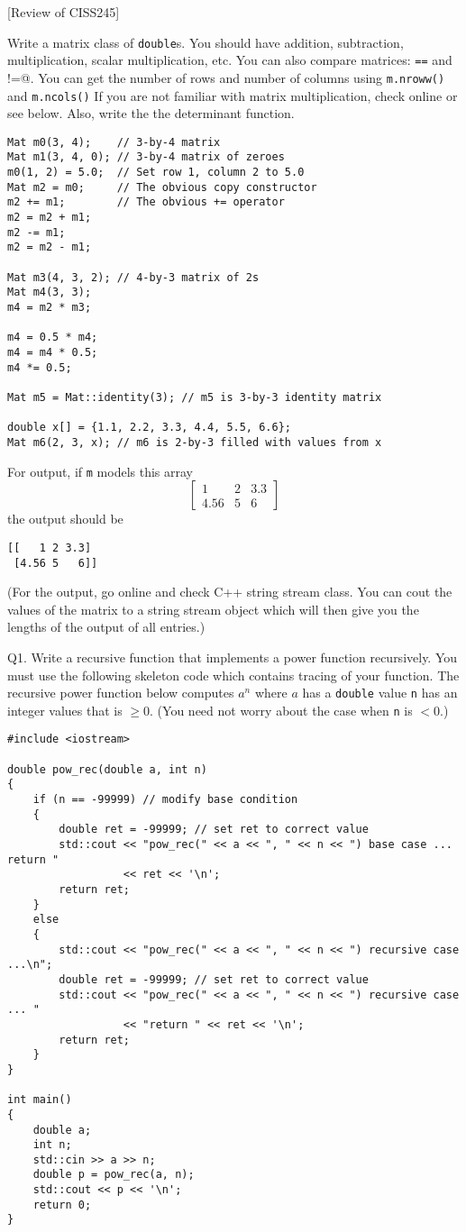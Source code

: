 [Review of CISS245]

Write a matrix class of \texttt{double}s.
You should have addition, subtraction, multiplication,
scalar multiplication, etc.
You can also compare matrices: \verb!==! and \verb@!=@.
You can get the number of rows and number of columns using
\verb!m.nroww()!
and
\verb!m.ncols()!
If you are not familiar with matrix multiplication,
check online or see below.
Also, write the the determinant function.
\begin{Verbatim}[frame=single]
Mat m0(3, 4);    // 3-by-4 matrix
Mat m1(3, 4, 0); // 3-by-4 matrix of zeroes
m0(1, 2) = 5.0;  // Set row 1, column 2 to 5.0
Mat m2 = m0;     // The obvious copy constructor
m2 += m1;        // The obvious += operator
m2 = m2 + m1;
m2 -= m1;
m2 = m2 - m1;

Mat m3(4, 3, 2); // 4-by-3 matrix of 2s
Mat m4(3, 3);
m4 = m2 * m3;

m4 = 0.5 * m4;
m4 = m4 * 0.5;
m4 *= 0.5;

Mat m5 = Mat::identity(3); // m5 is 3-by-3 identity matrix

double x[] = {1.1, 2.2, 3.3, 4.4, 5.5, 6.6};
Mat m6(2, 3, x); // m6 is 2-by-3 filled with values from x
\end{Verbatim}
For output, if \verb!m! models this array
\[
\begin{bmatrix}
1 & 2 & 3.3 \\
4.56 & 5 & 6 
\end{bmatrix}
\]
the output should be
\begin{Verbatim}
[[   1 2 3.3]
 [4.56 5   6]]
\end{Verbatim}
(For the output, go online and check C++ string stream class.
You can cout the values of the matrix to a string stream object
which will then give you the lengths of the output of all entries.)

\newpage
Q1. Write a recursive function that implements a power function
recursively. You must use the following skeleton code which
contains tracing of your function.
The recursive power function below computes $a^n$ where $a$ has a 
\verb!double! value \verb!n! has an integer values that is $\geq 0$.
(You need not worry about the case when \verb!n! is $< 0$.)
\begin{Verbatim}[frame=single, fontsize=\small]
#include <iostream>

double pow_rec(double a, int n)
{
    if (n == -99999) // modify base condition
    {
        double ret = -99999; // set ret to correct value
        std::cout << "pow_rec(" << a << ", " << n << ") base case ... return "
                  << ret << '\n';
        return ret;
    }
    else
    {
        std::cout << "pow_rec(" << a << ", " << n << ") recursive case ...\n";
        double ret = -99999; // set ret to correct value
        std::cout << "pow_rec(" << a << ", " << n << ") recursive case ... "
                  << "return " << ret << '\n';
        return ret;        
    }
}

int main()
{
    double a;
    int n;
    std::cin >> a >> n;
    double p = pow_rec(a, n);
    std::cout << p << '\n';
    return 0;
}
\end{Verbatim}


